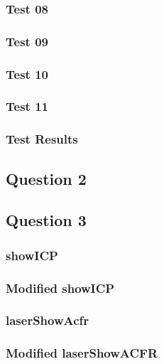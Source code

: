 		\subsubsection{Test 08}
		
		\pagebreak
		\subsubsection{Test 09}
		
		\pagebreak
		\subsubsection{Test 10}
		
		\pagebreak
		\subsubsection{Test 11}
		
		\pagebreak
		\subsubsection{Test Results}
		
		\pagebreak
	\pagebreak
	
	\subsection{Question 2}
	\pagebreak
	
	\subsection{Question 3}
		\subsubsection{showICP}
		
		\pagebreak
		\subsubsection{Modified showICP}
			
		\pagebreak
		\subsubsection{laserShowAcfr}
			
		\pagebreak
		\subsubsection{Modified laserShowACFR}
			
		\pagebreak

